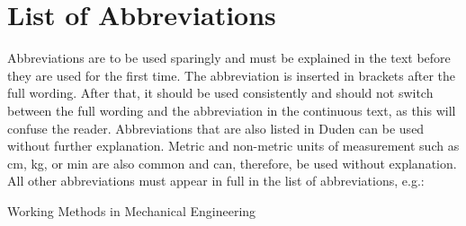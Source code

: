 \chapter*{List of Abbreviations}

Abbreviations are to be used sparingly and must be explained in the text before they are used for the first time. The abbreviation is inserted in brackets after the full wording. After that, it should be used consistently and should not switch between the full wording and the abbreviation in the continuous text, as this will confuse the reader. Abbreviations that are also listed in Duden can be used without further explanation. Metric and non-metric units of measurement such as cm, kg, or min are also common and can, therefore, be used without explanation. All other abbreviations must appear in full in the list of abbreviations, e.g.:

\begin{acronym}[WME]
	 {Working Methods in Mechanical Engineering}
\end{acronym}